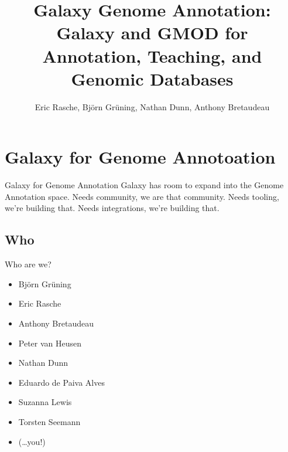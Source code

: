 \documentclass[12pt]{phage3slides} %
\title[Galaxy for Genome Annotation]{Galaxy Genome Annotation: Galaxy and GMOD for Annotation, Teaching, and Genomic Databases}
\author[ER, BG, ND, AB]{Eric Rasche, Bj\"orn Gr\"uning, Nathan Dunn, Anthony Bretaudeau}
\begin{document}
\frame{\titlepage}




\section[GGA]{Galaxy for Genome Annotoation}
\begin{frame}{Galaxy for Genome Annotation}
    Galaxy has room to expand into the Genome Annotation space.
    Needs community, we are that community.
    Needs tooling, we're building that.
    Needs integrations, we're building that.
\end{frame}

\subsection{Who}
\begin{frame}{Who are we?}
    \begin{itemize}
        \item Bj\"orn Gr\"uning
        \item Eric Rasche
        \item Anthony Bretaudeau
        \item Peter van Heusen
        \item Nathan Dunn
        \item Eduardo de Paiva Alves
        \item Suzanna Lewis
        \item Torsten Seemann
        \item (\ldots you!)
    \end{itemize}
\end{frame}
\end{document}
